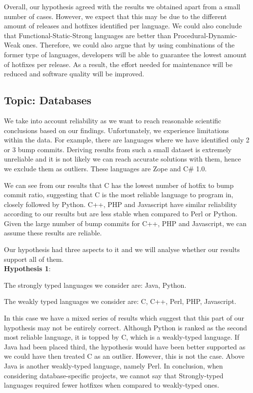 Overall, our hypothesis agreed with the results we obtained apart from a small number of cases. However, we expect that this may be due to the different amount of releases and hotfixes identified per language. We could also conclude that Functional-Static-Strong languages are better than Procedural-Dynamic-Weak ones. Therefore, we could also argue that by using combinations of the former type of languages, developers will be able to guarantee the lowest amount of hotfixes per release. As a result, the effort needed for maintenance will be reduced and software quality will be improved.

\subsection{Topic: Databases}
We take into account reliability as we want to reach reasonable scientific conclusions based on our findings. Unfortunately, we experience limitations within the data. For example, there are languages where we have identified only 2 or 3 bump commits. Deriving results from such a small dataset is extremely unreliable and it is not likely we can reach accurate solutions with them, hence we exclude them as outliers. These languages are Zope and C\# 1.0.\par
We can see from our results that C has the lowest number of hotfix to bump commit ratio, suggesting that C is the most reliable language to program in, closely followed by Python. C++, PHP and Javascript have similar reliability according to our results but are less stable when compared to Perl or Python. Given the large number of bump commits for C++, PHP and Javascript, we can assume these results are reliable.\par
Our hypothesis had three aspects to it and we will analyse whether our results support all of them.\\

\textbf{Hypothesis 1}:\par
The strongly typed languages we consider are: Java, Python.\par
The weakly typed languages we consider are: C, C++, Perl, PHP, Javascript.\par
In this case we have a mixed series of results which suggest that this part of our hypothesis may not be entirely correct. Although Python is ranked as the second most reliable language, it is topped by C, which is a weakly-typed language. If Java had been placed third,  the hypothesis would have been better supported as we could have then treated C as an outlier. However, this is not the case. Above Java is another weakly-typed language, namely Perl. In conclusion, when considering database-specific projects, we cannot say that Strongly-typed languages required fewer hotfixes when compared to weakly-typed ones.\\

